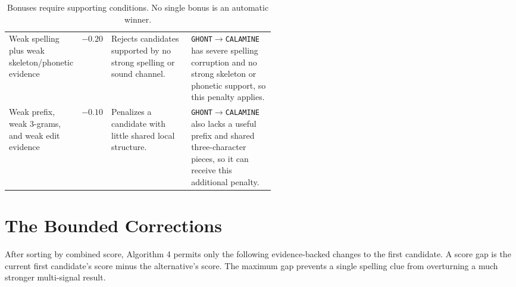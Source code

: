 \documentclass[11pt,a4paper]{article}
\newcommand{\code}[1]{\texttt{#1}}
\begin{document}
\begin{table}[H]
\begin{tabularx}{\linewidth}{@{}L{0.22\linewidth}rL{0.30\linewidth}Y@{}}
Weak spelling plus weak skeleton/phonetic evidence & $-0.20$ & Rejects candidates supported by no strong spelling or sound channel. & \code{GHONT}$\rightarrow$\code{CALAMINE} has severe spelling corruption and no strong skeleton or phonetic support, so this penalty applies. \\
Weak prefix, weak 3-grams, and weak edit evidence & $-0.10$ & Penalizes a candidate with little shared local structure. & \code{GHONT}$\rightarrow$\code{CALAMINE} also lacks a useful prefix and shared three-character pieces, so it can receive this additional penalty. \\
\bottomrule
\end{tabularx}
\caption{Bonuses require supporting conditions. No single bonus is an automatic winner.}
\label{tab:bonuses}
\end{table}

\section{The Bounded Corrections}

After sorting by combined score, Algorithm 4 permits only the following
evidence-backed changes to the first candidate. A score gap is the current
first candidate's score minus the alternative's score. The maximum gap prevents
a single spelling clue from overturning a much stronger multi-signal result.
\end{document}
